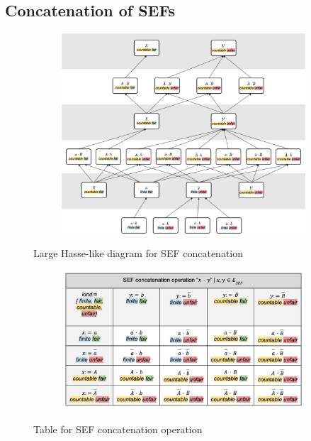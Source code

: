 \begin{appendices}
  \pagebreak
  \subsection{Concatenation of SEFs}
  \begin{figure}[h!]
    \centering
    \begin{subfigure}[b]{1.0\linewidth}
      \includegraphics[width=\linewidth]{appendix/concat-hasse-large.png}
    \end{subfigure}
    \caption{Large Hasse-like diagram for SEF concatenation}
    \label{fig:concatlarge}
  \end{figure}

  \pagebreak
  \begin{figure}[h!]
    \centering
    \begin{subfigure}[b]{0.8\linewidth}
      \includegraphics[width=\linewidth]{appendix/concat-table.png}
    \end{subfigure}
    \caption{Table for SEF concatenation operation}
    \label{fig:concattab}
  \end{figure}


\end{appendices}
